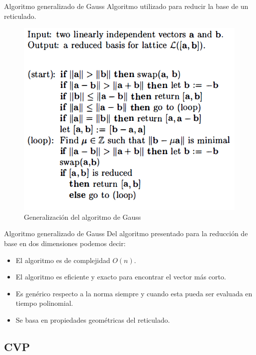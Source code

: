 \begin{frame}{Algoritmo generalizado de Gauss}
Algoritmo utilizado para reducir la base de un reticulado. 
    \begin{figure}
        \centering
        \includegraphics[width=0.65\linewidth]{figures/lattice_gaussAlg.png}
        \caption{Generalización del algoritmo de Gauss}
    \end{figure}
\end{frame}

\begin{frame}{Algoritmo generalizado de Gauss}
Del algoritmo presentado para la reducción de base en dos dimensiones podemos decir:
\begin{itemize}
    \item El algoritmo es de complejidad $O(n)$.
    \item El algoritmo es eficiente y exacto para encontrar el vector más corto.
    \item Es genérico respecto a la norma siempre y cuando esta pueda ser evaluada en tiempo polinomial.
    \item Se basa en propiedades geométricas del reticulado. 
\end{itemize}
\end{frame}

\subsection{CVP}

